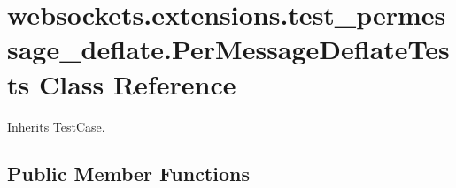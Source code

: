 \hypertarget{classwebsockets_1_1extensions_1_1test__permessage__deflate_1_1_per_message_deflate_tests}{}\section{websockets.\+extensions.\+test\+\_\+permessage\+\_\+deflate.\+Per\+Message\+Deflate\+Tests Class Reference}
\label{classwebsockets_1_1extensions_1_1test__permessage__deflate_1_1_per_message_deflate_tests}


Inherits Test\+Case.

\subsection*{Public Member Functions}

